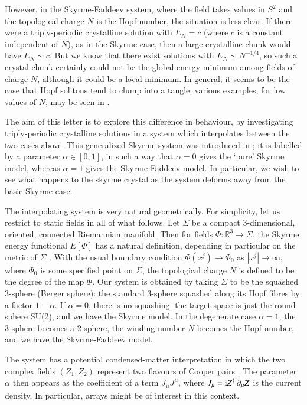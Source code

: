 \documentclass[5p]{elsarticle}
\newcommand{\pa}{\partial}
\newcommand{\ii}{{\rm i}}
\newcommand{\RR}{\mathbb R}
\begin{document}
However, in the Skyrme-Faddeev system, where the field takes values in $S^2$
and the topological charge $N$ is the Hopf number, the situation is less clear.
If there were a triply-periodic crystalline solution with $E_N=c$
(where $c$ is a constant independent of $N$), as in the Skyrme case,
then a large crystalline chunk would have $E_N\sim c$.
But we know \cite{Y04} that there exist solutions with
$E_N\sim N^{-1/4}$, so such a crystal chunk certainly could not be the global
energy minimum among fields of charge $N$, although it could be a local
minimum. In general, it seems to be the case that Hopf solitons tend to clump
into a tangle; various examples, for low values of $N$, may be seen in
\cite{BS99, HS99, HJS04, S07, JH09}.

The aim of this letter is to explore this difference in behaviour, by
investigating triply-periodic crystalline solutions in a system which
interpolates between the two cases above. This generalized Skyrme system
was introduced in \cite{W04}; it is labelled by a parameter $\alpha\in[0,1]$,
in such a way that $\alpha=0$ gives the `pure' Skyrme model, whereas
$\alpha=1$ gives the Skyrme-Faddeev model. In particular, we wish to see
what happens to the skyrme crystal as the system deforms away from the basic
Skyrme case.

The interpolating system is very natural geometrically. For simplicity,
let us restrict to static fields in all of what follows. Let $\Sigma$ be a
compact 3-dimensional, oriented, connected Riemannian manifold.
Then for fields $\Phi:\RR^3\to\Sigma$, the Skyrme energy functional
$E[\Phi]$ has a natural definition, depending in particular on the metric
of $\Sigma$ \cite{M87}.  With the usual boundary condition
$\Phi(x^j)\to \Phi_0$ as $|x^j|\to \infty$, where $\Phi_0$ is some specified
point on $\Sigma$, the topological charge $N$ is defined to be
the degree of the map $\Phi$.
Our system is obtained by taking $\Sigma$ to be the squashed 3-sphere
(Berger sphere): the standard 3-sphere squashed along its Hopf
fibres by a factor $1-\alpha$. If $\alpha=0$, there is no squashing:
the target space is just the round sphere SU(2), and we have the Skyrme model.
In the degenerate case $\alpha=1$, the 3-sphere becomes a 2-sphere, the
winding number $N$ becomes the Hopf number, and we have the Skyrme-Faddeev
model.

The system has a potential condensed-matter interpretation in which the
two complex fields $(Z_1,Z_2)$ represent two flavours of Cooper pairs
\cite{BFN02}. The parameter $\alpha$ then appears as the coefficient of a
term $J_{\mu} J^{\mu}$, where $J_{\mu}=\ii Z^\dagger\,\pa_{\mu}Z$ is the current
density. In particular, arrays might be of interest in this context.
\end{document}
